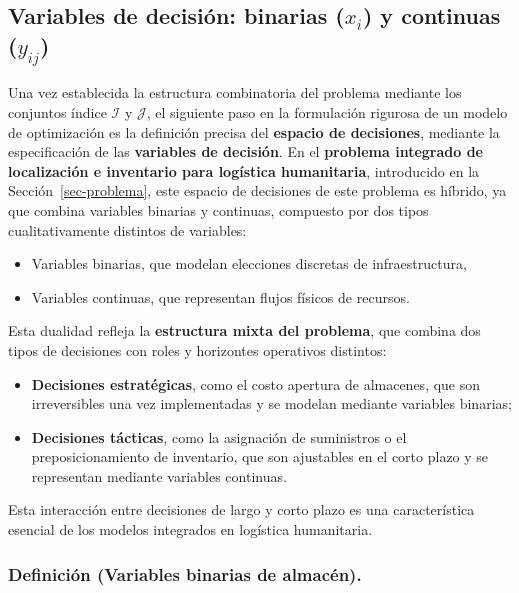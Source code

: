 \documentclass[
  spanish,
  us-letterpaper,
]{scrreprt}
\providecommand{\tightlist}{%
  \setlength{\itemsep}{0pt}\setlength{\parskip}{0pt}}
\numberwithin{equation}{section}
\begin{document}
\subsection{\texorpdfstring{Variables de decisión: binarias (\(x_i\)) y
continuas
(\(y_{ij}\))}{Variables de decisión: binarias (x\_i) y continuas (y\_\{ij\})}}\label{variables-de-decisiuxf3n-binarias-x_i-y-continuas-y_ij}

Una vez establecida la estructura combinatoria del problema mediante los
conjuntos índice \(\mathcal{I}\) y \(\mathcal{J}\), el siguiente paso en
la formulación rigurosa de un modelo de optimización es la definición
precisa del \textbf{espacio de decisiones}, mediante la especificación
de las \textbf{variables de decisión}. En el \textbf{problema integrado
de localización e inventario para logística humanitaria}, introducido en
la Sección~\ref{sec-problema}, este espacio de decisiones de este
problema es híbrido, ya que combina variables binarias y continuas,
compuesto por dos tipos cualitativamente distintos de variables:

\begin{itemize}
\tightlist
\item
  Variables binarias, que modelan elecciones discretas de
  infraestructura,
\item
  Variables continuas, que representan flujos físicos de recursos.
\end{itemize}

Esta dualidad refleja la \textbf{estructura mixta del problema}, que
combina dos tipos de decisiones con roles y horizontes operativos
distintos:

\begin{itemize}
\tightlist
\item
  \textbf{Decisiones estratégicas}, como el costo apertura de almacenes,
  que son irreversibles una vez implementadas y se modelan mediante
  variables binarias;
\item
  \textbf{Decisiones tácticas}, como la asignación de suministros o el
  preposicionamiento de inventario, que son ajustables en el corto plazo
  y se representan mediante variables continuas.
\end{itemize}

Esta interacción entre decisiones de largo y corto plazo es una
característica esencial de los modelos integrados en logística
humanitaria.

\subsubsection{\texorpdfstring{\textbf{Definición (Variables binarias de
almacén).}}{Definición (Variables binarias de almacén).}}\label{definiciuxf3n-variables-binarias-de-almacuxe9n.}
\end{document}
